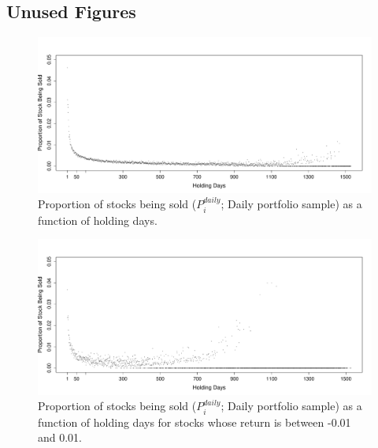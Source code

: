 \documentclass[11pt, a4paper]{article}
\begin{document}
\begin{appendices}
\clearpage

\section{Unused Figures}


\begin{figure}[H]
	\centering
	\includegraphics[width=0.8\columnwidth]{barc_prop_holding_days.pdf}
	\caption{Proportion of stocks being sold ($P^{daily}_{i}$; Daily portfolio sample) as a function of holding days.}
	\label{figure:prop_on_days}
\end{figure}

\begin{figure}[H]
	\centering
	\includegraphics[width=0.8\columnwidth]{barc_prop_holding_days_around_zero.pdf}
	\caption{Proportion of stocks being sold ($P^{daily}_{i}$; Daily portfolio sample) as a function of holding days for stocks whose return is between -0.01 and 0.01.}
	\label{figure:prop_on_days_around_zero}
\end{figure}





\end{appendices}
\end{document}
